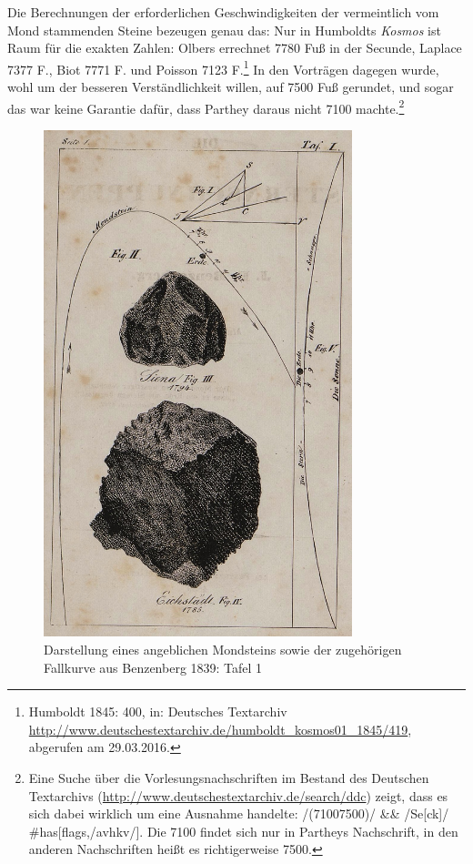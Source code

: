 Die Berechnungen der erforderlichen Geschwindigkeiten der vermeintlich \linebreak
vom Mond stammenden Steine bezeugen genau das: Nur in Humboldts
\emph{Kosmos} ist Raum für die exakten Zahlen: Olbers errechnet 7780 Fuß
in der Secunde, Laplace 7377 F., Biot 7771 F. und Poisson 7123
F.\footnote{Humboldt 1845: 400, in: Deutsches Textarchiv
  \url{http://www.deutschestextarchiv.de/humboldt_kosmos01_1845/419},
  abgerufen am 29.03.2016.} In den Vorträgen dagegen wurde, wohl um der
besseren Verständlichkeit willen, auf 7500 Fuß gerundet, und sogar das
war keine Garantie dafür, dass Parthey daraus nicht 7100
machte.\footnote{Eine Suche über die Vorlesungsnachschriften im Bestand
  des Deutschen Textarchivs
  (\url{http://www.deutschestextarchiv.de/search/ddc}) zeigt, dass es
  sich dabei wirklich um eine Ausnahme handelte: /(7100\textbar{}7500)/
  \&\& /Se{[}ck{]}/ \#has{[}flags,/avhkv/{]}. Die 7100 findet sich nur
  in Partheys Nachschrift, in den anderen Nachschriften heißt es
  richtigerweise 7500.}

\begin{figure}[htbp]
\centering
\includegraphics[width=0.8\textwidth]{figures/hug02.jpg}
\caption{Darstellung eines angeblichen Mondsteins sowie der zugehörigen
Fallkurve aus Benzenberg 1839: Tafel 1}
\end{figure}

